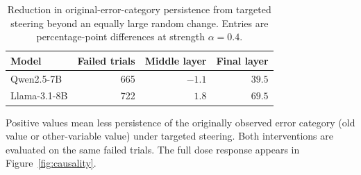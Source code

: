 \begin{table}[htbp]
\centering
\small
\setlength{\tabcolsep}{8pt}
\caption{Reduction in original-error-category persistence from targeted steering
beyond an equally large random change. Entries are percentage-point differences at strength $\alpha=0.4$.}
\label{tab:steering-summary}
\begin{tabular}{@{}lrrr@{}}
\toprule
Model & Failed trials & Middle layer & Final layer \\
\midrule
Qwen2.5-7B   & 665 & $-1.1$ & $39.5$ \\
Llama-3.1-8B & 722 & $1.8$ & $69.5$ \\
\bottomrule
\end{tabular}
\vspace{3pt}\parbox{0.95\linewidth}{\footnotesize
Positive values mean less persistence of the originally observed error category
(old value or other-variable value) under targeted steering. Both interventions are evaluated on the same failed trials.
The full dose response appears in Figure~\ref{fig:causality}.}
\end{table}

